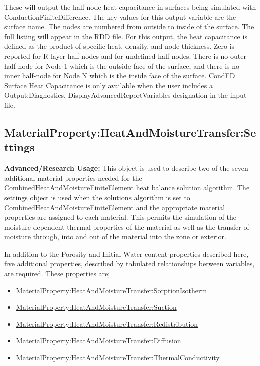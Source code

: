 These will output the half-node heat capacitance in surfaces being simulated with ConductionFiniteDifference. The key values for this output variable are the surface name. The nodes are numbered from outside to inside of the surface. The full listing will appear in the RDD file. For this output, the heat capacitance is defined as the product of specific heat, density, and node thickness. Zero is reported for R-layer half-nodes and for undefined half-nodes. There is no outer half-node for Node 1 which is the outside face of the surface, and there is no inner half-node for Node N which is the inside face of the surface. CondFD Surface Heat Capacitance is only available when the user includes a Output:Diagnostics, DisplayAdvancedReportVariables designation in the input file.

\subsection{MaterialProperty:HeatAndMoistureTransfer:Settings}\label{materialpropertyheatandmoisturetransfersettings}

\textbf{Advanced/Research Usage:} This object is used to describe two of the seven additional material properties needed for the CombinedHeatAndMoistureFiniteElement heat balance solution algorithm. The settings object is used when the solutions algorithm is set to CombinedHeatAndMoistureFiniteElement and the appropriate material properties are assigned to each material. This permits the simulation of the moisture dependent thermal properties of the material as well as the transfer of moisture through, into and out of the material into the zone or exterior.

In addition to the Porosity and Initial Water content properties described here, five additional properties, described by tabulated relationships between variables, are required. These properties are;

\begin{itemize}
\item
  \hyperref[materialpropertyheatandmoisturetransfersorptionisotherm]{MaterialProperty:HeatAndMoistureTransfer:SorptionIsotherm}
\item
  \hyperref[materialpropertyheatandmoisturetransfersuction]{MaterialProperty:HeatAndMoistureTransfer:Suction}
\item
  \hyperref[materialpropertyheatandmoisturetransferredistribution]{MaterialProperty:HeatAndMoistureTransfer:Redistribution}
\item
  \hyperref[materialpropertyheatandmoisturetransferdiffusion]{MaterialProperty:HeatAndMoistureTransfer:Diffusion}
\item
  \hyperref[materialpropertyheatandmoisturetransferthermalconductivity]{MaterialProperty:HeatAndMoistureTransfer:ThermalConductivity}
\end{itemize}

